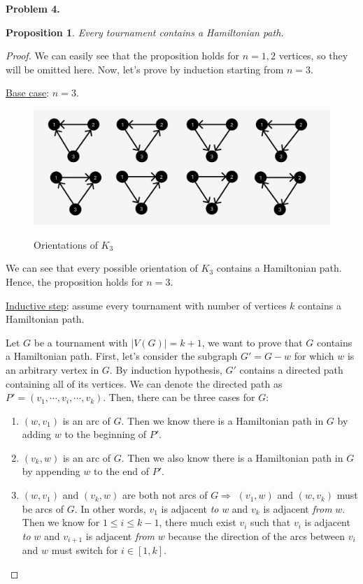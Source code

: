 \documentclass{article}
\newtheorem{prop}[thm]{Proposition}
\begin{document}
\textbf{Problem 4.}
\begin{prop}
    Every tournament contains a Hamiltonian path.
\end{prop}
\begin{proof}
    We can easily see that the proposition holds for $n=1,2$ vertices, so they will be omitted here.
    Now, let's prove by induction starting from $n=3$.

    \underline{Base case}: $n=3$.
    \begin{figure}[h]
        \centering
        {\includegraphics[scale=0.5]{K3_orientations.png}}
        \caption{Orientations of $K_3$}
    \end{figure}

    We can see that every possible orientation of $K_3$ contains a Hamiltonian path.
    Hence, the proposition holds for $n=3$.

    \underline{Inductive step}: assume every tournament with number of vertices $k$ contains a Hamiltonian path.
    
    Let $G$ be a tournament with $|V(G)|=k+1$, we want to prove that $G$ contains a Hamiltonian path.
    First, let's consider the subgraph $G' = G - w$ for which $w$ is an arbitrary vertex in $G$.
    By induction hypothesis, $G'$ contains a directed path containing all of its vertices.
    We can denote the directed path as $P'=(v_1, \cdots, v_i, \cdots, v_k)$.
    Then, there can be three cases for $G$:

    \begin{enumerate}[label=Case \arabic*:]
        \item 
        $(w, v_1)$ is an arc of $G$. 
        Then we know there is a Hamiltonian path in $G$ by adding $w$ to the beginning of $P'$.

        \item
        $(v_k, w)$ is an arc of $G$. 
        Then we also know there is a Hamiltonian path in $G$ by appending $w$ to the end of $P'$.

        \item 
        $(w, v_1)$ and $(v_k, w)$ are both not arcs of $G \Rightarrow$ $(v_1, w)$ and $(w, v_k)$ must be arcs of $G$.
        In other words, $v_1$ is adjacent \emph{to} $w$ and $v_k$ is adjacent \emph{from} $w$.
        Then we know for $1 \le i \le k-1$, there much exist $v_i$ such that $v_i$ is adjacent \emph{to} $w$ and $v_{i+1}$ is adjacent \emph{from} $w$
        because the direction of the arcs between $v_i$ and $w$ must switch for $i \in [1, k]$.
        

\end{enumerate}
\end{proof}
\end{document}
